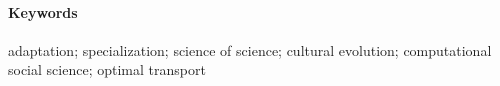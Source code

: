\documentclass{article}
\begin{document}
 \paragraph{Keywords}{adaptation; specialization; science of science;  cultural evolution; computational social science; optimal transport}

 






\end{document}
